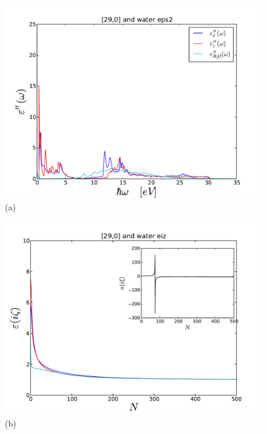 \documentclass[onecolumn,letterpaper,amsmath,amssymb,floatfix,aps,superscriptaddress]{revtex4}
\begin{document}
\begin{figure}[t!]
\begin{center}
\begin{minipage}[b]{0.40\textwidth}
\begin{center}
\includegraphics[width=1.2\textwidth]{prop_plots/290w290_eps2.pdf} (a)
\end{center}
\end{minipage}
\hskip 43pt
\begin{minipage}[b]{0.40\textwidth}
\begin{center}
\includegraphics[width=1.2\textwidth]{prop_plots/290w290_eiz.pdf} (b)
\end{center}

\end{minipage}
\end{center}
\end{figure}
\end{document}
